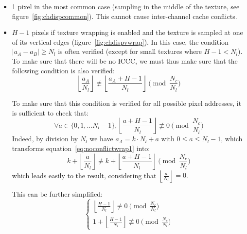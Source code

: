 \documentclass[a4paper,11pt]{kthesis}
\begin{document}
\begin{itemize}
\item 1 pixel in the most common case (sampling in the middle of the texture, see figure~\ref{fig:chdispcommon}). This cannot cause inter-channel cache conflicts.
\item $H-1$ pixels if texture wrapping is enabled and the texture is sampled at one of its vertical edges (figure~\ref{fig:chdispvwrap}). In this case, the condition $|a_{A}-a_{B}| \geq N_{l}$ is often verified (except for small textures where $H-1 < N_{l}$). To make sure that there will be no ICCC, we must thus make sure that the following condition is also verified:
\begin{equation}\label{eq:noconflictwrap1}
\left\lfloor \frac{a_{A}}{N_{l}} \right\rfloor \not \equiv \left\lfloor \frac{a_{A}+H-1}{N_{l}} \right\rfloor \pmod{\frac{N_{c}}{N_{l}}}
\end{equation}

To make sure that this condition is verified for all possible pixel addresses, it is sufficient to check that:
\begin{equation}
\forall a \in \{0, 1, ... N_{l}-1\}, \left\lfloor \frac{a+H-1}{N_{l}} \right\rfloor \not \equiv 0 \pmod{\frac{N_{c}}{N_{l}}}
\end{equation}
Indeed, by division by $N_{l}$ we have $a_{A} = k \cdot N_{l} + a$ with $0 \leq a \leq N_{l}-1$, which transforms equation~\ref{eq:noconflictwrap1} into:
\begin{equation}
k + \left\lfloor \frac{a}{N_{l}} \right\rfloor \not \equiv k + \left\lfloor \frac{a+H-1}{N_{l}} \right\rfloor \pmod{\frac{N_{c}}{N_{l}}}
\end{equation}
which leads easily to the result, considering that $\left\lfloor \frac{a}{N_{l}} \right\rfloor = 0$.

This can be further simplified:
\begin{equation}
\begin{cases}
\left\lfloor \frac{H-1}{N_{l}} \right\rfloor \not \equiv 0 \pmod{\frac{N_{c}}{N_{l}}} \\
1 + \left\lfloor \frac{H-1}{N_{l}} \right\rfloor \not \equiv 0 \pmod{\frac{N_{c}}{N_{l}}}
\end{cases}
\end{equation}
\end{itemize}
\end{document}
